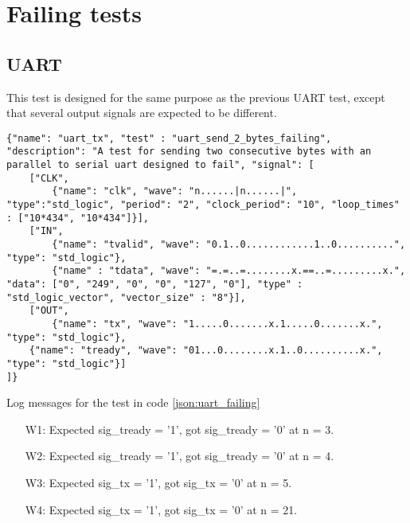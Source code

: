 \section{Failing tests}
\subsection{UART}
This test is designed for the same purpose as the previous UART test, except that several output signals are expected to be different.
\begin{lstlisting}[style=json, caption={Failing functionality test for the UART design in appendix \ref{appendix:uart}}, label={json:uart_failing}]
{"name": "uart_tx", "test" : "uart_send_2_bytes_failing", "description": "A test for sending two consecutive bytes with an parallel to serial uart designed to fail", "signal": [
	["CLK",
		{"name": "clk", "wave": "n......|n......|", "type":"std_logic", "period": "2", "clock_period": "10", "loop_times" : ["10*434", "10*434"]}],
	["IN",
		{"name": "tvalid", "wave": "0.1..0............1..0..........", "type": "std_logic"},
		{"name" : "tdata", "wave": "=.=..=........x.==..=.........x.", "data": ["0", "249", "0", "0", "127", "0"], "type" : "std_logic_vector", "vector_size" : "8"}],
	["OUT",
		{"name": "tx", "wave": "1.....0.......x.1.....0.......x.", "type": "std_logic"},
	{"name": "tready", "wave": "01...0........x.1..0..........x.", "type": "std_logic"}]
]}
\end{lstlisting}
\begin{customenv}
	\caption{Log messages for the test in code \ref{json:uart_failing}}
	\begin{itemize}
		\item [W1:] Expected sig\_tready =  '1',  got sig\_tready =  '0' at n = 3.
		\item [W2:] Expected sig\_tready =  '1',  got sig\_tready =  '0' at n = 4.
		\item [W3:] Expected sig\_tx =  '1',  got sig\_tx =  '0' at n = 5.
		\item [W4:] Expected sig\_tx =  '1',  got sig\_tx =  '0' at n = 21.
	\end{itemize}
\end{customenv}\clearpage\noindent
